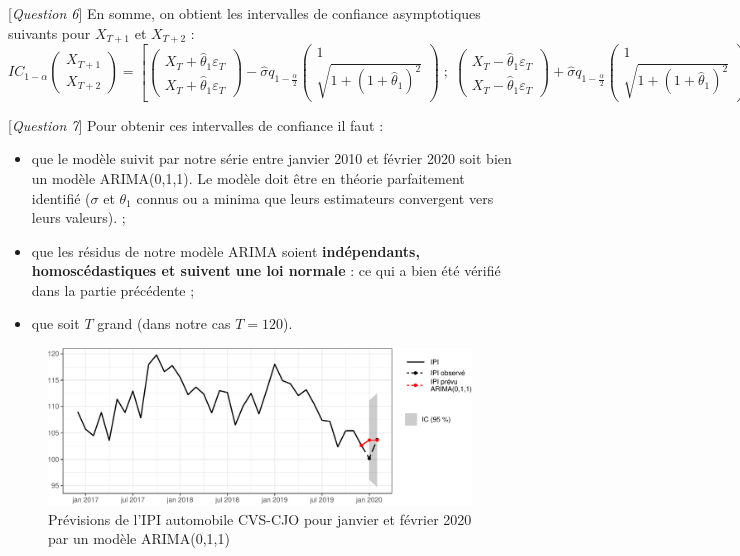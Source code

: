 \documentclass[,french]{article}
\providecommand{\tightlist}{%
  \setlength{\itemsep}{0pt}\setlength{\parskip}{0pt}}
\begin{document}
{[}\emph{Question 6}{]} En somme, on obtient les intervalles de confiance asymptotiques suivants pour \(X_{T+1}\) et \(X_{T+2}\) :
\begin{equation}
IC_{1-\alpha}\begin{pmatrix} X_{T+1}
\\ X_{T+2}\end{pmatrix} =
\left[
  \begin{pmatrix} 
    X_T + \widehat\theta_1\varepsilon_T 
    \\ X_T + \widehat\theta_1\varepsilon_T 
  \end{pmatrix}
  -
  \widehat\sigma q_{1-\frac \alpha 2}
  \begin{pmatrix} 
    1\\
    \sqrt{1+(1+\widehat \theta_1)^2}
  \end{pmatrix}
  \;;\;
  \begin{pmatrix} 
    X_T - \widehat\theta_1\varepsilon_T 
    \\ X_T - \widehat\theta_1\varepsilon_T 
  \end{pmatrix}
  +
  \widehat\sigma q_{1-\frac \alpha 2}
  \begin{pmatrix} 
    1\\
    \sqrt{1+(1+\widehat \theta_1)^2}
  \end{pmatrix}
\right]
\label{eq:icPrev}
\end{equation}

{[}\emph{Question 7}{]} Pour obtenir ces intervalles de confiance il faut :

\begin{itemize}
\tightlist
\item
  que le modèle suivit par notre série entre janvier 2010 et février 2020 soit bien un modèle ARIMA(0,1,1). Le modèle doit être en théorie parfaitement identifié (\(\sigma\) et \(\theta_1\) connus ou a minima que leurs estimateurs convergent vers leurs valeurs). ;
\item
  que les résidus de notre modèle ARIMA soient \textbf{indépendants, homoscédastiques et suivent une loi normale} : ce qui a bien été vérifié dans la partie précédente ;\\
\item
  que soit \(T\) grand (dans notre cas \(T=120\)).
\end{itemize}

\begin{figure}

{\centering \includegraphics{img/rmd-prevIpi-1} 

}

\caption{Prévisions de l'IPI automobile CVS-CJO pour janvier et février 2020 par un modèle ARIMA(0,1,1)}\label{fig:prevIpi}
\end{figure}
\end{document}
